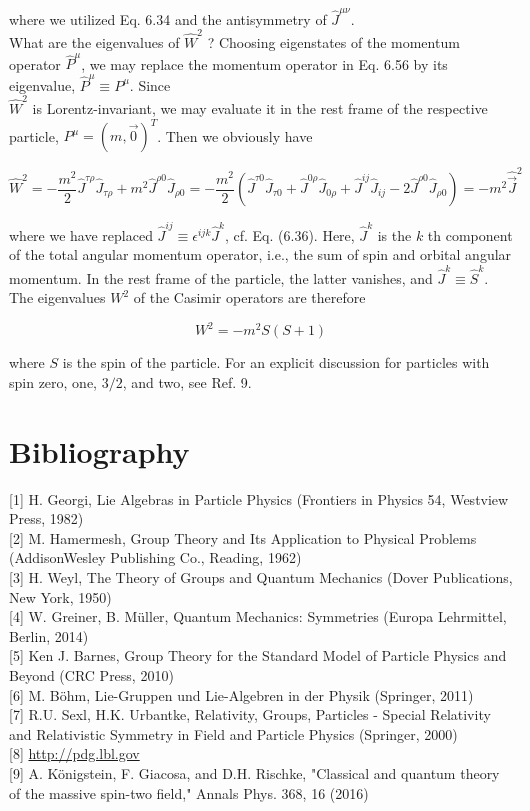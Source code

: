 \documentclass[10pt, letterpaper]{article}
\begin{document}
where we utilized Eq. 6.34 and the antisymmetry of $\hat{J}^{\mu \nu}$.\\
What are the eigenvalues of $\hat{W}^{2}$ ? Choosing eigenstates of the momentum operator $\hat{P}^{\mu}$, we may replace the momentum operator in Eq. 6.56 by its eigenvalue, $\hat{P}^{\mu} \equiv P^{\mu}$. Since\\
$\hat{W}^{2}$ is Lorentz-invariant, we may evaluate it in the rest frame of the respective particle, $P^{\mu}=(m, \overrightarrow{0})^{T}$. Then we obviously have

$$
\hat{W}^{2}=-\frac{m^{2}}{2} \hat{J}^{\tau \rho} \hat{J}_{\tau \rho}+m^{2} \hat{J}^{\rho 0} \hat{J}_{\rho 0}=-\frac{m^{2}}{2}\left(\hat{J}^{\tau 0} \hat{J}_{\tau 0}+\hat{J}^{0 \rho} \hat{J}_{0 \rho}+\hat{J}^{i j} \hat{J}_{i j}-2 \hat{J}^{\rho 0} \hat{J}_{\rho 0}\right)=-m^{2} \hat{\vec{J}}^{2}
$$

where we have replaced $\hat{J}^{i j} \equiv \epsilon^{i j k} \hat{J}^{k}$, cf. Eq. (6.36). Here, $\hat{J}^{k}$ is the $k$ th component of the total angular momentum operator, i.e., the sum of spin and orbital angular momentum. In the rest frame of the particle, the latter vanishes, and $\hat{J}^{k} \equiv \hat{S}^{k}$. The eigenvalues $W^{2}$ of the Casimir operators are therefore

$$
W^{2}=-m^{2} S(S+1)
$$

where $S$ is the spin of the particle. For an explicit discussion for particles with spin zero, one, $3 / 2$, and two, see Ref. 9.

\section{Bibliography}
[1] H. Georgi, Lie Algebras in Particle Physics (Frontiers in Physics 54, Westview Press, 1982)\\[0pt]
[2] M. Hamermesh, Group Theory and Its Application to Physical Problems (AddisonWesley Publishing Co., Reading, 1962)\\[0pt]
[3] H. Weyl, The Theory of Groups and Quantum Mechanics (Dover Publications, New York, 1950)\\[0pt]
[4] W. Greiner, B. Müller, Quantum Mechanics: Symmetries (Europa Lehrmittel, Berlin, 2014)\\[0pt]
[5] Ken J. Barnes, Group Theory for the Standard Model of Particle Physics and Beyond (CRC Press, 2010)\\[0pt]
[6] M. Böhm, Lie-Gruppen und Lie-Algebren in der Physik (Springer, 2011)\\[0pt]
[7] R.U. Sexl, H.K. Urbantke, Relativity, Groups, Particles - Special Relativity and Relativistic Symmetry in Field and Particle Physics (Springer, 2000)\\[0pt]
[8] \href{http://pdg.lbl.gov}{http://pdg.lbl.gov}\\[0pt]
[9] A. Königstein, F. Giacosa, and D.H. Rischke, "Classical and quantum theory of the massive spin-two field," Annals Phys. 368, 16 (2016)
\end{document}
